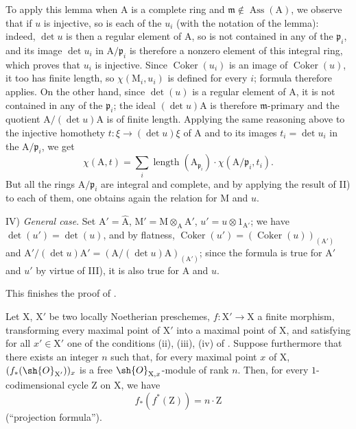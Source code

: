 To apply this lemma when $\mathrm{A}$ is a complete ring and $\mathfrak{m}\notin\operatorname{Ass}(\mathrm{A})$, we observe that if $u$ is injective, so is each of the $u_i$ (with the notation of the lemma): indeed, $\det u$ is then a regular element of $\mathrm{A}$, so is not contained in any of the $\mathfrak{p}_i$, and its image $\det u_i$ in $\mathrm{A}/\mathfrak{p}_i$ is therefore a nonzero element of this integral ring, which proves that $u_i$ is injective.
Since $\operatorname{Coker}(u_i)$ is an image of $\operatorname{Coker}(u)$, it too has finite length, so $\chi(\mathrm{M}_i,u_i)$ is defined for every $i$; formula  therefore applies.
On the other hand, since $\det(u)$ is a regular element of $\mathrm{A}$, it is not contained in any of the $\mathfrak{p}_i$; the ideal $(\det u)\mathrm{A}$ is therefore $\mathfrak{m}$-primary and the quotient $\mathrm{A}/(\det u)\mathrm{A}$ is of finite length.
Applying the same reasoning above to the injective homothety $t:\xi\to(\det u)\xi$ of $\mathrm{A}$ and to its images $t_i=\det u_i$ in the $\mathrm{A}/\mathfrak{p}_i$, we get
\[
  \chi(\mathrm{A},t)=\sum_i\operatorname{length}(\mathrm{A}_{\mathfrak{p}_i})\cdot\chi(\mathrm{A}/\mathfrak{p}_i,t_i).
\]
But all the rings $\mathrm{A}/\mathfrak{p}_i$ are integral and complete, and by applying the result of II) to each of them, one obtains again the relation  for $\mathrm{M}$ and $u$.

IV) \emph{General case}.
Set $\mathrm{A}'=\widehat{\mathrm{A}}$, $\mathrm{M}'=\mathrm{M}\otimes_{\mathrm{A}}\mathrm{A}'$, $u'=u\otimes 1_{\mathrm{A}'}$; we have $\det(u')=\det(u)$, and by flatness, $\operatorname{Coker}(u')=(\operatorname{Coker}(u))_{(\mathrm{A}')}$ and $\mathrm{A}'/(\det u)\mathrm{A}'=(\mathrm{A}/(\det u)\mathrm{A})_{(\mathrm{A}')}$; since the formula  is true for $\mathrm{A}'$ and $u'$ by virtue of III), it is also true for $\mathrm{A}$ and $u$.

This finishes the proof of .

\begin{proposition}[21.10.18]
\label{IV.21.10.18}
Let $\mathrm{X}$, $\mathrm{X}'$ be two locally Noetherian preschemes, $f:\mathrm{X}'\to\mathrm{X}$ a finite morphism, transforming every maximal point of $\mathrm{X}'$ into a maximal point of $\mathrm{X}$, and satisfying for all $x'\in\mathrm{X}'$ one of the conditions (ii), (iii), (iv) of .
Suppose furthermore that there exists an integer $n$ such that, for every maximal point $x$ of $\mathrm{X}$, $(f_*(\sh{O}_{\mathrm{X}'}))_x$ is a free $\sh{O}_{\mathrm{X},x}$-module of rank $n$.
Then, for every $1$-codimensional cycle $\mathrm{Z}$ on $\mathrm{X}$, we have
\[
\label{IV.21.10.18.1}
  f_*(f^*(\mathrm{Z}))=n\cdot\mathrm{Z}
  \tag{21.10.18.1}
\]
(``projection formula'').
\end{proposition}

